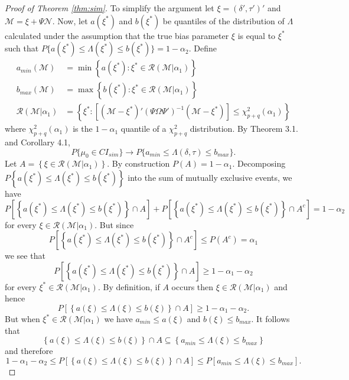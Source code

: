 \begin{proof}[Proof of Theorem \ref{thm:sim}]
To simplify the argument let $\xi = (\delta', \tau')'$ and $\mathscr{M} = \xi + \Psi \mathscr{N}$.
Now, let $a(\xi^*)$ and  $b(\xi^*)$ be quantiles of the distribution of $\Lambda$ calculated under the assumption that the true bias parameter $\xi$ is equal to $\xi^*$ such that $P\{a(\xi^*) \leq \Lambda(\xi^*)\leq b(\xi^*)\} = 1-\alpha_2$.
Define
\begin{align*}
  a_{min}(\mathscr{M}) &= \min\left\{a(\xi^*) \colon \xi^* \in \mathscr{R}(\mathscr{M}|\alpha_1)  \right\}\\
  b_{max}(\mathscr{M}) &= \max\left\{b(\xi^*) \colon \xi^* \in \mathscr{R}(\mathscr{M}|\alpha_1)  \right\}\\
  \mathscr{R}(\mathscr{M}|\alpha_1) &= \left\{ \xi^* \colon \left[\left(\mathscr{M} - \xi^*\right)' \left( \Psi \Omega \Psi' \right)^{-1}\left( \mathscr{M} - \xi^* \right)\right] \leq \chi^2_{p+q}(\alpha_1) \right\}
\end{align*}
where $\chi_{p+q}^2(\alpha_1)$ is the $1-\alpha_1$ quantile of a $\chi_{p+q}^2$ distribution. 
By Theorem 3.1. and Corollary 4.1, 
\[
P\{ \mu_0 \in CI_{sim}\} \rightarrow P\{ a_{min} \leq \Lambda(\delta, \tau) \leq b_{max}\}.
\]
Let $A = \left \{\xi \in \mathscr{R}(\mathscr{M}|\alpha_1) \right\}$.
By construction $P(A) = 1 - \alpha_1$.
Decomposing $P\left\{ a(\xi^*) \leq \Lambda(\xi^*) \leq b(\xi^*)  \right\}$ into the sum of mutually exclusive events, we have
\[
P\left[\left\{ a(\xi^*) \leq \Lambda(\xi^*) \leq b(\xi^*)  \right\} \cap A \right] + P\left[\left\{ a(\xi^*) \leq \Lambda(\xi^*) \leq b(\xi^*)  \right\} \cap A^c \right] = 1-\alpha_2
\]
for every $\xi \in \mathscr{R}(\mathcal{M}|\alpha_1)$.
But since 
\[
P\left[\left\{ a(\xi^*) \leq \Lambda(\xi^*) \leq b(\xi^*)  \right\} \cap A^c \right] \leq P(A^c) = \alpha_1
\]
we see that
\[
P\left[\left\{ a(\xi^*) \leq \Lambda(\xi^*) \leq b(\xi^*)  \right\} \cap A \right] \geq 1- \alpha_1 - \alpha_2
\]
for every $\xi^* \in \mathscr{R}(\mathscr{M}|\alpha_1)$.
By definition, if $A$ occurs then $\xi \in \mathscr{R}(\mathscr{M}|\alpha_1)$ and hence 
\[
P\left[\left\{ a(\xi) \leq \Lambda(\xi) \leq b(\xi)  \right\} \cap A \right] \geq 1- \alpha_1 - \alpha_2.
\]
But when $\xi^* \in  \mathscr{R}(\mathscr{M}|\alpha_1)$ we have
$a_{min} \leq a(\xi)$ and $b(\xi) \leq b_{max}$. It follows that 
\[
\left \{ a(\xi) \leq \Lambda (\xi) \leq b(\xi) \right \} \cap A \subseteq \left\{ a_{min} \leq \Lambda (\xi) \leq b_{max}\right \}
\]
and therefore
\[
  1-\alpha_1 - \alpha_2 \leq P\left[\left \{ a(\xi) \leq \Lambda (\xi) \leq b(\xi) \right \} \cap A  \right]
\leq P\left[ a_{min} \leq \Lambda(\xi) \leq b_{max} \right].
\]
\end{proof}
